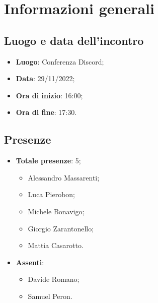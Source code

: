 \section{Informazioni generali}

    \subsection{Luogo e data dell'incontro}
    \begin{itemize}
        \item \textbf{Luogo}: Conferenza Discord;
        \item \textbf{Data}: 29/11/2022;
        \item \textbf{Ora di inizio}: 16:00;
        \item \textbf{Ora di fine}: 17:30.
    \end{itemize}
    \subsection{Presenze}
    \begin{itemize}
        \item \textbf{Totale presenze}: 5;
        \begin{itemize}
            \item Alessandro Massarenti;
            \item Luca Pierobon;
            \item Michele Bonavigo;
            \item Giorgio Zarantonello;
            \item Mattia Casarotto.
        \end{itemize}
        \item \textbf{Assenti}:
        \begin{itemize}
            \item Davide Romano;
            \item Samuel Peron.
        \end{itemize}
    \end{itemize}